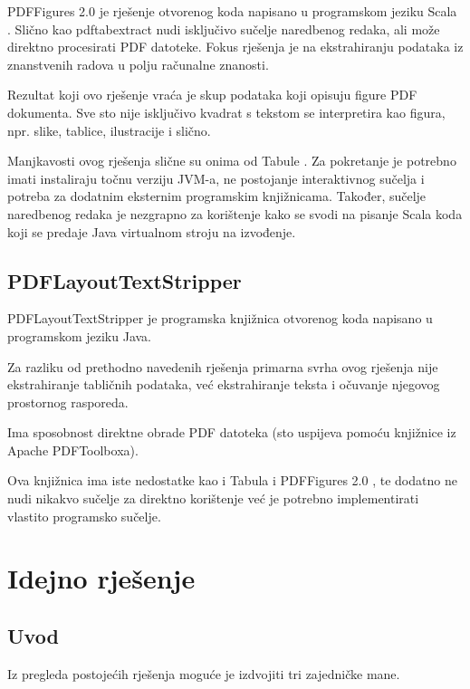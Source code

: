 \documentclass[times, utf8, zavrsni]{fer}
\begin{document}
PDFFigures 2.0 \cite{pdffigures_2_repository} je rješenje otvorenog koda
napisano u programskom jeziku Scala \cite{scala_documentation}. Slično kao
pdftabextract nudi isključivo
sučelje naredbenog redaka, ali može direktno procesirati PDF datoteke. Fokus
rješenja je na ekstrahiranju podataka iz znanstvenih radova u polju računalne
znanosti.

Rezultat koji ovo rješenje vraća je skup podataka koji opisuju figure PDF
dokumenta. Sve sto nije isključivo kvadrat s tekstom se interpretira kao
figura, npr. slike, tablice, ilustracije i slično.

Manjkavosti ovog rješenja slične su onima od Tabule \cite{tabula_repository}.
Za pokretanje je potrebno
imati instaliraju točnu verziju JVM-a, ne postojanje interaktivnog sučelja i
potreba za dodatnim eksternim programskim knjižnicama. Također, sučelje
naredbenog redaka je nezgrapno za korištenje kako se svodi na pisanje Scala koda
koji se predaje Java virtualnom stroju na izvođenje.

\section{PDFLayoutTextStripper}

PDFLayoutTextStripper \cite{pdflayouttextstripper_repository} je programska
knjižnica otvorenog koda napisano u programskom jeziku Java.

Za razliku od prethodno navedenih rješenja primarna svrha ovog rješenja nije
ekstrahiranje tabličnih podataka, već ekstrahiranje teksta i očuvanje njegovog
prostornog rasporeda.

Ima sposobnost direktne obrade PDF datoteka (sto uspijeva pomoću knjižnice iz
Apache PDFToolboxa).

Ova knjižnica ima iste nedostatke kao i Tabula \cite{tabula_repository} i
PDFFigures 2.0 \cite{pdffigures_2_repository}, te dodatno ne
nudi nikakvo sučelje za direktno korištenje već je potrebno implementirati
vlastito programsko sučelje.



\chapter{Idejno rješenje}

\section{Uvod}

Iz pregleda postojećih rješenja moguće je izdvojiti tri zajedničke mane.
\end{document}
